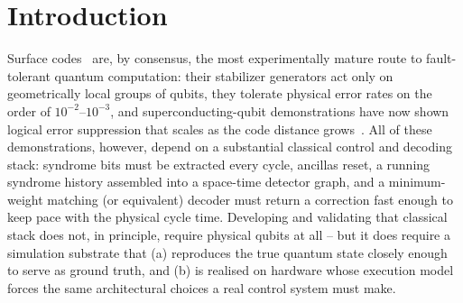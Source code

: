 \documentclass[pdflatex,sn-mathphys,Numbered]{sn-jnl}
\begin{document}

\maketitle

\section{Introduction}\label{sec:intro}

Surface codes~\cite{kitaev2003,bravyikitaev1998,dennis2002,fowler2012} are, by consensus, the most experimentally mature route to fault-tolerant quantum computation: their stabilizer generators act only on geometrically local groups of qubits, they tolerate physical error rates on the order of $10^{-2}$--$10^{-3}$, and superconducting-qubit demonstrations have now shown logical error suppression that scales as the code distance grows~\cite{acharya2023}. All of these demonstrations, however, depend on a substantial classical control and decoding stack: syndrome bits must be extracted every cycle, ancillas reset, a running syndrome history assembled into a space-time detector graph, and a minimum-weight matching (or equivalent) decoder must return a correction fast enough to keep pace with the physical cycle time. Developing and validating that classical stack does not, in principle, require physical qubits at all -- but it does require a simulation substrate that (a) reproduces the true quantum state closely enough to serve as ground truth, and (b) is realised on hardware whose execution model forces the same architectural choices a real control system must make.
\end{document}
